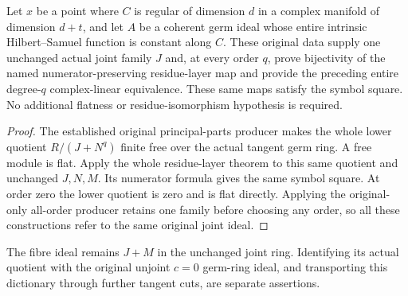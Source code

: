 \begin{theorem}
\label{hir:actual-principal-parts-joint-residue-symbols}
\leanok
{}
Let $x$ be a point where $C$ is regular of dimension $d$ in a complex
manifold of dimension $d+t$, and let $A$ be a coherent germ ideal whose
entire intrinsic Hilbert--Samuel function is constant along $C$.
These original data supply one unchanged actual joint family $J$ and,
at every order $q$, prove
bijectivity of the named numerator-preserving residue-layer map and
provide the preceding entire degree-$q$ complex-linear equivalence.
These same maps satisfy the symbol square. No additional flatness
or residue-isomorphism hypothesis is required.
\end{theorem}
\begin{proof}
The established original principal-parts producer makes the whole lower
quotient $R/(J+N^q)$ finite free over the actual tangent germ ring.
A free module is flat. Apply the whole residue-layer theorem to this
same quotient and unchanged $J,N,M$. Its numerator formula gives the
same symbol square. At order zero the lower quotient is zero and is
flat directly. Applying the original-only all-order producer retains
one family before choosing any order, so all these constructions refer
to the same original joint ideal.
\end{proof}

The fibre ideal remains $J+M$ in the unchanged joint ring. Identifying
its actual quotient with the original unjoint $c=0$ germ-ring ideal,
and transporting this dictionary through further tangent cuts, are
separate assertions.
